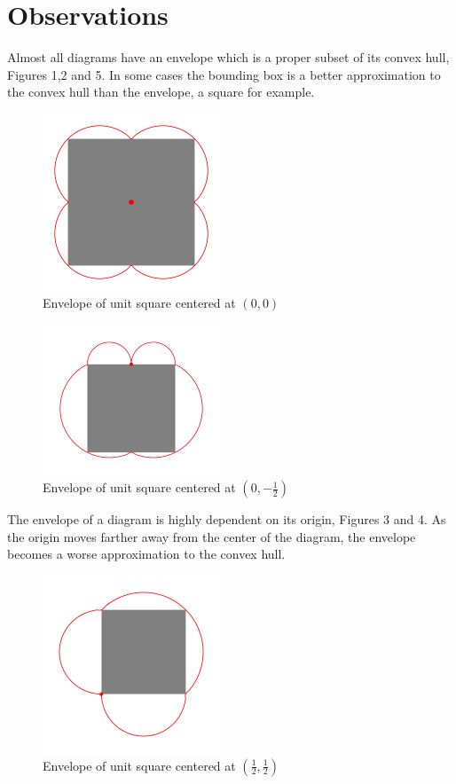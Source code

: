 \documentclass[11pt]{amsart}
\begin{document}
\section{Observations}

Almost all diagrams have an envelope which is a proper subset of its convex hull, Figures 1,2 and 5.
In some cases the bounding box is a better approximation to the convex hull than the envelope, a square
for example.

\begin{figure}[h]
\label{s00}
 \centering
\includegraphics[width=150pt]{sq1_0_0.png}
\caption{Envelope of unit square centered at $(0,0)$}
\end{figure}

\begin{figure}[h]
\label{s05}
 \centering
\includegraphics[width=150pt]{sq1_05.png}
\caption{Envelope of unit square centered at $(0,-\frac{1}{2})$}
\end{figure}

The envelope of a diagram is highly dependent on its origin, Figures 3 and 4.
As the origin moves farther away from the center of the diagram, the envelope becomes a 
worse approximation to the convex hull.

\begin{figure}[h]
\label{s55}
 \centering
\includegraphics[width=150pt]{sq1_55.png}
\caption{Envelope of unit square centered at $(\frac{1}{2}, \frac{1}{2})$}
\end{figure}
\end{document}
